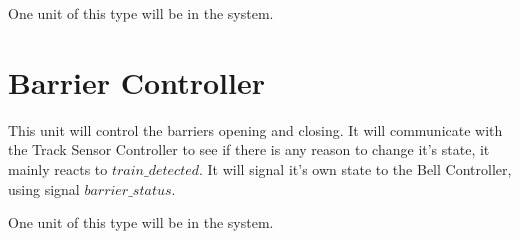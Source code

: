 \documentclass[final]{report}
\begin{document}
One unit of this type will be in the system.

\section{Barrier Controller}\label{sec:architecture-barrier-controller}
This unit will control the barriers opening and closing.
It will communicate with the Track Sensor Controller to see if there is any reason to change it's state, it mainly reacts to $train\_detected$.
It will signal it's own state to the Bell Controller, using signal $barrier\_status$.

One unit of this type will be in the system.
\end{document}
